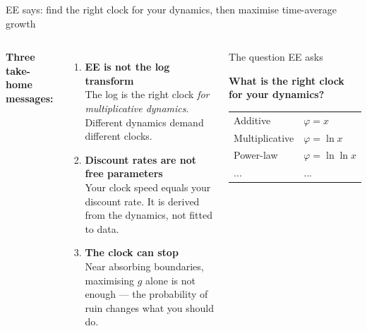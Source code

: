 \begin{frame}{EE says: find the right clock for your dynamics, then maximise time-average growth}

\begin{columns}[T]
\vspace{0.4em}
\textbf{Three take-home messages:}

\vspace{0.6em}
\begin{enumerate}\setlength\itemsep{10pt}
  \item \textbf{EE is not the log transform} \\ The log is the right clock \emph{for multiplicative dynamics}. Different dynamics demand different clocks.

  \item \textbf{Discount rates are not free parameters} \\ Your clock speed equals your discount rate. It is derived from the dynamics, not fitted to data.

  \item \textbf{The clock can stop} \\ Near absorbing boundaries, maximising $g$ alone is not enough — the probability of ruin changes what you should do.
\end{enumerate}

\vspace{0.3em}
\begin{exampleblock}{\textcolor{EEgreen}{The question EE asks}}
\vspace{0.4em}
\begin{center}
\large\bfseries\color{EEblue}
What is the right clock\\[0.3em]for your dynamics?
\end{center}
\vspace{0.5em}
\begin{tabular}{ll}
Additive & $\varphi = x$ \\
Multiplicative & $\varphi = \ln x$ \\
Power-law & $\varphi = \ln\ln x$ \\
... & ...\\
\end{tabular}
\vspace{0.3em}
\end{exampleblock}

\vspace{0.8em}
\end{columns}
\end{frame}


